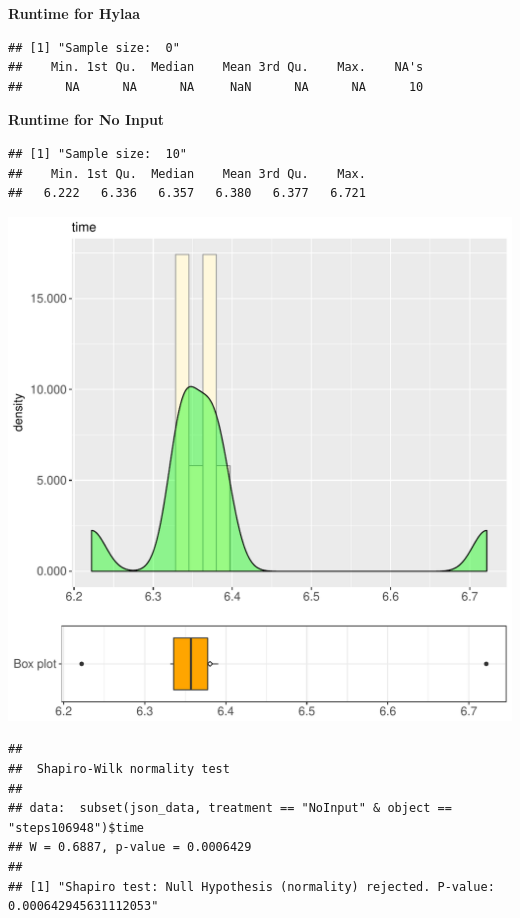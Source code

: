 \documentclass{article}\usepackage[]{graphicx}\usepackage[]{color}
\makeatletter
\def\maxwidth{ %
  \ifdim\Gin@nat@width>\linewidth
    \linewidth
  \else
    \Gin@nat@width
  \fi
}
\newenvironment{kframe}{%
 \def\at@end@of@kframe{}%
 \ifinner\ifhmode%
  \def\at@end@of@kframe{\end{minipage}}%
  \begin{minipage}{\columnwidth}%
 \fi\fi%
 \def\FrameCommand##1{\hskip\@totalleftmargin \hskip-\fboxsep
 \colorbox{shadecolor}{##1}\hskip-\fboxsep
     \hskip-\linewidth \hskip-\@totalleftmargin \hskip\columnwidth}%
 \MakeFramed {\advance\hsize-\width
   \@totalleftmargin\z@ \linewidth\hsize
   \@setminipage}}%
 {\par\unskip\endMakeFramed%
 \at@end@of@kframe}
\newenvironment{knitrout}{}{} %
\makeatother
\begin{document}
 \textbf{Runtime for Hylaa}
\begin{knitrout}
\color{fgcolor}\begin{kframe}
\begin{verbatim}
## [1] "Sample size:  0"
##    Min. 1st Qu.  Median    Mean 3rd Qu.    Max.    NA's 
##      NA      NA      NA     NaN      NA      NA      10
\end{verbatim}
\end{kframe}
\end{knitrout}
 \textbf{Runtime for No Input}
\begin{knitrout}
\color{fgcolor}\begin{kframe}
\begin{verbatim}
## [1] "Sample size:  10"
##    Min. 1st Qu.  Median    Mean 3rd Qu.    Max. 
##   6.222   6.336   6.357   6.380   6.377   6.721
\end{verbatim}
\end{kframe}
\includegraphics[width=\maxwidth]{figure/RH4_NoInput_steps106948-1} 
\begin{kframe}\begin{verbatim}
## 
## 	Shapiro-Wilk normality test
## 
## data:  subset(json_data, treatment == "NoInput" & object == "steps106948")$time
## W = 0.6887, p-value = 0.0006429
## 
## [1] "Shapiro test: Null Hypothesis (normality) rejected. P-value: 0.000642945631112053"
\end{verbatim}
\end{kframe}
\end{knitrout}
  
\end{document}
